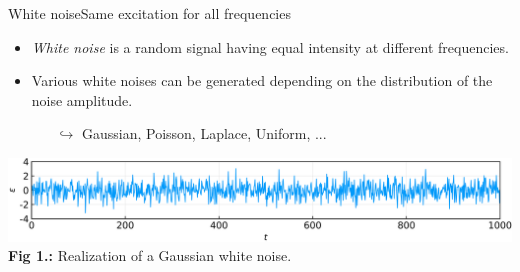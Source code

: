 \documentclass[usenames,dvipsnames,svgnames,10pt,aspectratio=169]{beamer}
\begin{document}
\begin{frame}[t, c]{White noise}{Same excitation for all frequencies}
	\centering

	\begin{itemize}
		\item \emph{White noise} is a random signal having equal intensity at different frequencies.

		\medskip

		\item Various white noises can be generated depending on the distribution of the noise amplitude.
		\begin{itemize}
			\item[$\hookrightarrow$] Gaussian, Poisson, Laplace, Uniform, ...
		\end{itemize}
	\end{itemize}

	\bigskip

	\includegraphics[width=.9\textwidth]{gaussian_white_noise} \\
	\textbf{Fig 1.:} Realization of a Gaussian white noise.

	\vspace{1cm}
\end{frame}
\end{document}
